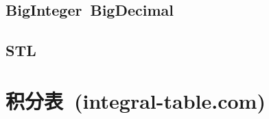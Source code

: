     \subsection*{BigInteger\ BigDecimal}
    \subsection*{STL}
\section{积分表\ \small(integral-table.com)}
    \begin{multicols}{2}
        
    \end{multicols}
